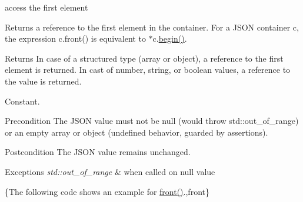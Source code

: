 access the first element 

Returns a reference to the first element in the container. For a J\-S\-O\-N container {\ttfamily c}, the expression {\ttfamily c.\-front()} is equivalent to {\ttfamily $\ast$c.\hyperlink{classnlohmann_1_1basic__json_ad4e381c54039607be08d7af41a1f6ad1}{begin()}}.

\begin{DoxyReturn}{Returns}
In case of a structured type (array or object), a reference to the first element is returned. In cast of number, string, or boolean values, a reference to the value is returned.
\end{DoxyReturn}
Constant.

\begin{DoxyPrecond}{Precondition}
The J\-S\-O\-N value must not be {\ttfamily null} (would throw {\ttfamily std\-::out\-\_\-of\-\_\-range}) or an empty array or object (undefined behavior, guarded by assertions). 
\end{DoxyPrecond}
\begin{DoxyPostcond}{Postcondition}
The J\-S\-O\-N value remains unchanged.
\end{DoxyPostcond}

\begin{DoxyExceptions}{Exceptions}
{\em std\-::out\-\_\-of\-\_\-range} & when called on {\ttfamily null} value\\
\hline
\end{DoxyExceptions}
\{The following code shows an example for {\ttfamily \hyperlink{classnlohmann_1_1basic__json_aa45753034bea87f9d2c0c42ace9ff75c}{front()}}.,front\}

